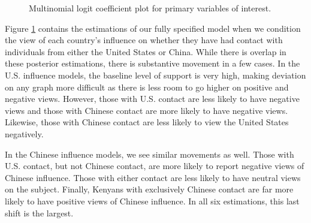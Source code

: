 \begin{figure}[t]
	\begin{center}
		\caption{Multinomial logit coefficient plot for primary variables of interest. \label{pp}}
	\end{center}
\end{figure}

Figure \ref{pp} contains the estimations of our fully specified model when we condition the view of each country's influence on whether they have had contact with individuals from either the United States or China. While there is overlap in these posterior estimations, there is substantive movement in a few cases. In the U.S. influence models, the baseline level of support is very high, making deviation on any graph more difficult as there is less room to go higher on positive and negative views. However, those with U.S. contact are less likely to have negative views and those with Chinese contact are more likely to have negative views. Likewise, those with Chinese contact are less likely to view the United States negatively.

In the Chinese influence models, we see similar movements as well. Those with U.S. contact, but not Chinese contact, are more likely to report negative views of Chinese influence. Those with either contact are less likely to have neutral views on the subject. Finally, Kenyans with exclusively Chinese contact are far more likely to have positive views of Chinese influence. In all six estimations, this last shift is the largest.
